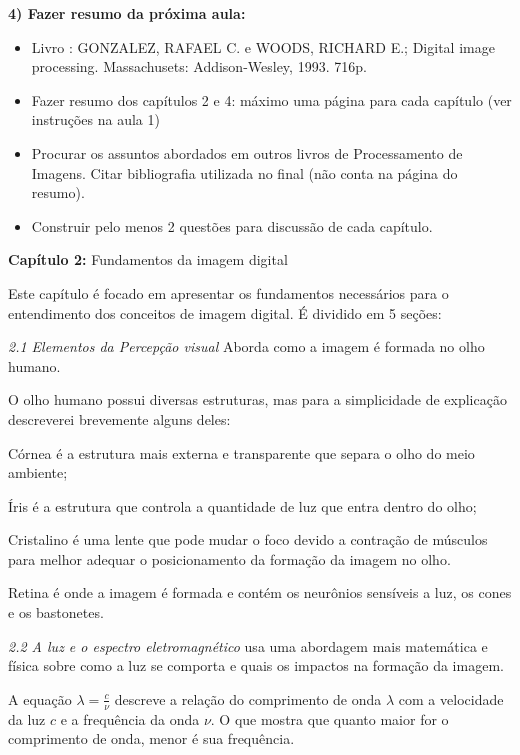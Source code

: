 \documentclass[a4paper]{sbgames}               %
\begin{document}
\textbf{4) Fazer resumo da próxima aula:}
\begin{itemize}
\item Livro : GONZALEZ, RAFAEL C. e WOODS, RICHARD E.; Digital image processing. Massachusets: Addison-Wesley, 1993. 716p. \cite{Gonzalez02a}
\item Fazer resumo dos capítulos 2 e 4: máximo uma página para cada capítulo (ver instruções na aula 1)
\item Procurar os assuntos abordados em outros livros de Processamento de Imagens. Citar bibliografia utilizada no final (não conta na página do resumo).
\item Construir pelo menos 2 questões para discussão de cada capítulo.
\end{itemize}

\pagebreak

\textbf{Capítulo 2:} Fundamentos da imagem digital

Este capítulo é focado em apresentar os fundamentos necessários para o entendimento dos conceitos de imagem digital. É dividido em 5 seções:

\textit{2.1 Elementos da Percepção visual} Aborda como a imagem é formada no olho humano. 

O olho humano possui diversas estruturas, mas para a simplicidade de explicação descreverei brevemente alguns deles:

\begin{description}
\item{Córnea} é a estrutura mais externa e transparente que separa o olho do meio ambiente;
\item{Íris} é a estrutura que controla a quantidade de luz que entra dentro do olho;
\item{Cristalino} é uma lente que pode mudar o foco devido a contração de músculos para melhor adequar o posicionamento da formação da imagem no olho.
\item{Retina} é onde a imagem é formada e contém os neurônios sensíveis a luz, os cones e os bastonetes. 
\end{description}

\textit{2.2 A luz e o espectro eletromagnético} usa uma abordagem mais matemática e física sobre como a luz se comporta e quais os impactos na formação da imagem.

A equação $\lambda=\frac{c}{\nu}$ descreve a relação do comprimento de onda $\lambda$ com a velocidade da luz $c$ e a frequência da onda $\nu$. O que mostra que quanto maior for o comprimento de onda, menor é sua frequência.
\end{document}

